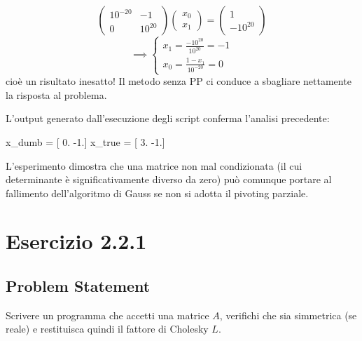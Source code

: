 \documentclass[11pt, a4paper]{article}
\begin{document}
\begin{enumerate}[resume=miolista]
    $$
        \begin{pmatrix}
            10^{-20} & -1 \\
            0 & 10^{20}
        \end{pmatrix}
        \begin{pmatrix}
            x_0 \\x_1
        \end{pmatrix} =
        \begin{pmatrix}
            1 \\ -10^{20}
        \end{pmatrix}
    $$
    $$
    \implies \begin{cases}
        x_1 = \frac{-10^{20}}{10^{20}} = -1 \\
        x_0 = \frac{1 - x_1}{10^{-20}} = 0 
    \end{cases}
    $$
    cioè un risultato inesatto! Il metodo senza PP ci conduce a sbagliare nettamente la risposta al problema.
        
    \noindent L'output generato dall'esecuzione degli script conferma l'analisi precedente:\\
    
    \begin{elegantcode}
x_dumb = [ 0. -1.]
x_true = [ 3. -1.]
    \end{elegantcode}
    
    \noindent L'esperimento dimostra che una matrice non mal condizionata (il cui determinante è significativamente diverso da zero) può comunque portare al fallimento dell'algoritmo di Gauss se non si adotta il pivoting parziale.
    
\end{enumerate}
\newpage





\section{Esercizio 2.2.1}
\label{sec: poisson res}
\subsection{Problem Statement}
Scrivere un programma che accetti una matrice $A$, verifichi che sia simmetrica (se reale) e restituisca quindi il fattore di Cholesky $L$.
\end{document}
